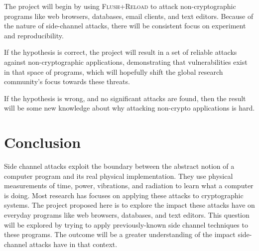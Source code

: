 \documentclass{acm_proc_article-sp}
\begin{document}
The project will begin by using \textsc{Flush+Reload} to attack
non-cryptographic programs like web browsers, databases, email clients, and text
editors. Because of the nature of side-channel attacks, there will be consistent
focus on experiment and reproducibility.

If the hypothesis is correct, the project will result in a set of reliable
attacks against non-cryptographic applications, demonstrating that
vulnerabilities exist in that space of programs, which will hopefully shift the
global research community's focus towards these threats.

If the hypothesis is wrong, and no significant attacks are found, then the
result will be some new knowledge about why attacking non-crypto applications is
hard.

\section{Conclusion}
\label{sec:conclusion}

Side channel attacks exploit the boundary between the abstract notion of
a computer program and its real physical implementation. They use physical
measurements of time, power, vibrations, and radiation to learn what a computer
is doing. Most research has focuses on applying these attacks to cryptographic
systems. The project proposed here is to explore the impact these attacks have
on everyday programs like web browsers, databases, and text editors. This
question will be explored by trying to apply previously-known side channel
techniques to these programs. The outcome will be a greater understanding of the
impact side-channel attacks have in that context.



\end{document}
